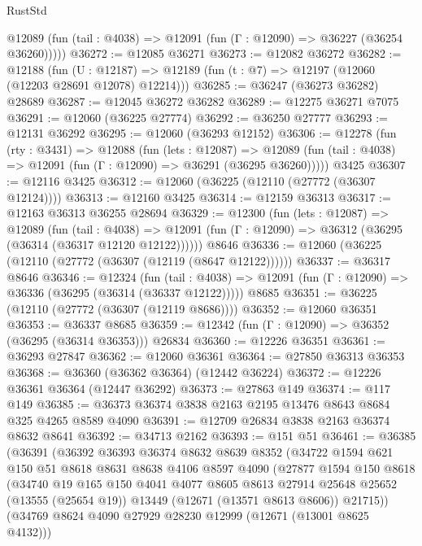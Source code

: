 \begin{lexlean}{RustStd}
\begin{coremodule}
      @12089 (fun (tail : @4038) => @12091 (fun (Γ : @12090) => @36227 (@36254 @36260)))))
@36272 := @12085 @36271
@36273 := @12082 @36272
@36282 := @12188
    (fun (U : @12187) => @12189 (fun (t : @7) => @12197 (@12060 (@12203 @28691 @12078) @12214)))
@36285 := @36247 (@36273 @36282) @28689
@36287 := @12045 @36272 @36282
@36289 := @12275 @36271 @7075
@36291 := @12060 (@36225 @27774)
@36292 := @36250 @27777
@36293 := @12131 @36292
@36295 := @12060 (@36293 @12152)
@36306 := @12278
    (fun (rty : @3431) =>
    @12088
      (fun (lets : @12087) =>
      @12089 (fun (tail : @4038) => @12091 (fun (Γ : @12090) => @36291 (@36295 @36260)))))
    @3425
@36307 := @12116 @3425
@36312 := @12060 (@36225 (@12110 (@27772 (@36307 @12124))))
@36313 := @12160 @3425
@36314 := @12159 @36313
@36317 := @12163 @36313 @36255 @28694
@36329 := @12300
    (fun (lets : @12087) =>
    @12089
      (fun (tail : @4038) =>
      @12091 (fun (Γ : @12090) => @36312 (@36295 (@36314 (@36317 @12120 @12122))))))
    @8646
@36336 := @12060 (@36225 (@12110 (@27772 (@36307 (@12119 (@8647 @12122))))))
@36337 := @36317 @8646
@36346 := @12324
    (fun (tail : @4038) => @12091 (fun (Γ : @12090) => @36336 (@36295 (@36314 (@36337 @12122)))))
    @8685
@36351 := @36225 (@12110 (@27772 (@36307 (@12119 @8686))))
@36352 := @12060 @36351
@36353 := @36337 @8685
@36359 := @12342 (fun (Γ : @12090) => @36352 (@36295 (@36314 @36353))) @26834
@36360 := @12226 @36351
@36361 := @36293 @27847
@36362 := @12060 @36361
@36364 := @27850 @36313 @36353
@36368 := @36360 (@36362 @36364) (@12442 @36224)
@36372 := @12226 @36361 @36364 (@12447 @36292)
@36373 := @27863 @149
@36374 := @117 @149
@36385 := @36373 @36374 @3838 @2163 @2195 @13476 @8643 @8684 @325 @4265 @8589 @4090
@36391 := @12709 @26834 @3838 @2163 @36374 @8632 @8641
@36392 := @34713 @2162
@36393 := @151 @51
@36461 := @36385
    (@36391
      (@36392
        @36393
        @36374
        @8632
        @8639
        @8352
        (@34722
          @1594
          @621
          @150
          @51
          @8618
          @8631
          @8638
          @4106
          @8597
          @4090
          (@27877
            @1594
            @150
            @8618
            (@34740
              @19
              @165
              @150
              @4041
              @4077
              @8605
              @8613
              @27914
              @25648
              @25652
              (@13555 (@25654 @19))
              @13449
              (@12671 (@13571 @8613 @8606))
              @21715))
          (@34769 @8624 @4090 @27929 @28230 @12999 (@12671 (@13001 @8625 @4132)))

\end{coremodule}
\end{lexlean}
